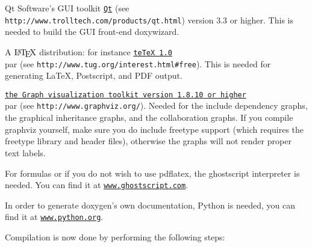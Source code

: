\begin{DoxyItemize}
\item Qt Software's GUI toolkit \href{http://www.trolltech.com/products/qt.html}{\tt Qt}  (see {\tt http://www.trolltech.com/products/qt.html})  version 3.3 or higher. This is needed to build the GUI front-\/end doxywizard. 
\item A $\mbox{\LaTeX}$ distribution: for instance \href{http://www.tug.org/interest.html#free}{\tt teTeX 1.0}  \\par (see {\tt http://www.tug.org/interest.html\#free}). This is needed for generating LaTeX, Postscript, and PDF output. 
\item \href{http://www.graphviz.org/}{\tt the Graph visualization toolkit version 1.8.10 or higher}  \\par (see {\tt http://www.graphviz.org/}). Needed for the include dependency graphs, the graphical inheritance graphs, and the collaboration graphs. If you compile graphviz yourself, make sure you do include freetype support (which requires the freetype library and header files), otherwise the graphs will not render proper text labels. 
\item For formulas or if you do not wish to use pdflatex, the ghostscript interpreter is needed. You can find it at \href{http://www.ghostscript.com/}{\tt www.ghostscript.com}. 
\item In order to generate doxygen's own documentation, Python is needed, you can find it at \href{http://www.python.org}{\tt www.python.org}. 
\end{DoxyItemize}

Compilation is now done by performing the following steps:


